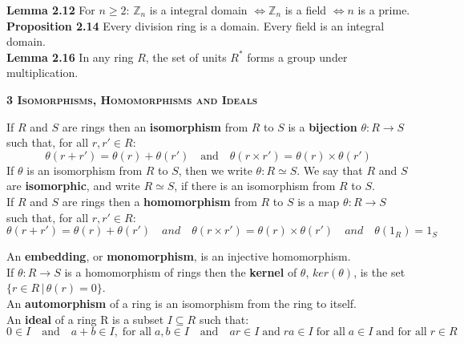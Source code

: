 \documentclass[a4paper]{article}
\begin{document}
\begin{framed}
	\noindent
	\textbf{Lemma 2.12} For $n \geq 2$: $\mathbb{Z}_n$ is a integral domain $\iff \mathbb{Z}_n$ is a field $\iff n$ is a prime.\\
	
	\noindent
	\textbf{Proposition 2.14} Every division ring is a domain. Every field is an integral domain.\\
	
	\noindent
	\textbf{Lemma 2.16} In any ring $R$, the set of units $R^*$ forms a group under multiplication.
\end{framed}

\begin{framed}
	\begin{center}
		\textbf{\textsc{3 Isomorphisms, Homomorphisms and Ideals}}
	\end{center}
	If $R$ and $S$ are rings then an \textbf{isomorphism} from $R$ to $S$ is a \textbf{bijection} $\theta: R \rightarrow S$ such that, for all $r, r' \in R$:\\
	$$\theta(r + r') = \theta(r) + \theta(r') \quad \text{and} \quad \theta(r \times r') = \theta(r) \times \theta(r')$$
	If $\theta$ is an isomorphism from $R$ to $S$, then we write $\theta: R \simeq S$. We say that $R$ and $S$ are \textbf{isomorphic}, and write $R \simeq S$, if there is an isomorphism from $R$ to $S$.\\
	
	\noindent
	If $R$ and $S$ are rings then a \textbf{homomorphism} from $R$ to $S$ is a map $\theta: R \rightarrow S$ such that, for all $r, r' \in R$:
	$$\theta(r + r') = \theta(r) + \theta(r') \quad and \quad \theta(r \times r') = \theta(r) \times \theta(r') \quad and \quad \theta(1_R) = 1_S$$
	
	\noindent
	An \textbf{embedding}, or \textbf{monomorphism}, is an injective homomorphism.\\
	
	\noindent
	If $\theta: R \rightarrow S$ is a homomorphism of rings then the \textbf{kernel} of $\theta$, $ker(\theta)$, is the set $\{r \in R \, \vert \, \theta(r) = 0\}$.\\
	
	\noindent
	An \textbf{automorphism} of a ring is an isomorphism from the ring to itself.\\
	
	\noindent
	An \textbf{ideal} of a ring R is a subset $I \subseteq R$ such that:
	$$0 \in I \quad \text{and} \quad a + b \in I, \; \text{for all} \; a, b \in I \quad \text{and} \quad ar \in I \; \text{and} \; ra \in I \; \text{for all} \; a \in I \; \text{and for all} \; r \in R$$
	

\end{framed}
\end{document}
